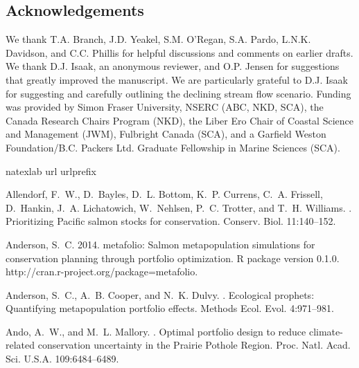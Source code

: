 \documentclass[12pt,english]{article}
\begin{document}
\begin{spacing}{1.9}
\section{Acknowledgements}\label{acknowledgements}

We thank T.A. Branch, J.D. Yeakel, S.M. O'Regan, S.A. Pardo, L.N.K. Davidson, and C.C. Phillis for helpful discussions and comments on earlier drafts. We thank D.J. Isaak, an anonymous reviewer, and O.P. Jensen for suggestions that greatly improved the manuscript. We are particularly grateful to D.J. Isaak for suggesting and carefully outlining the declining stream flow scenario. Funding was provided by Simon Fraser University, NSERC (ABC, NKD, SCA), the Canada Research Chairs Program (NKD), the Liber Ero Chair of Coastal Science and Management (JWM), Fulbright Canada (SCA), and a Garfield Weston Foundation/B.C. Packers Ltd. Graduate Fellowship in Marine Sciences (SCA).

%
%
%
\begin{thebibliography}{64}
\expandafter\ifx\csname natexlab\endcsname\relax\def\natexlab#1{#1}\fi
\expandafter\ifx\csname url\endcsname\relax
  \def\url#1{{\tt #1}}\fi
\expandafter\ifx\csname urlprefix\endcsname\relax\def\urlprefix{URL }\fi

Allendorf, F.~W., D.~Bayles, D.~L. Bottom, K.~P. Currens, C.~A. Frissell,
  D.~Hankin, J.~A. Lichatowich, W.~Nehlsen, P.~C. Trotter, and T.~H. Williams.
.
\newblock Prioritizing {Pacific} salmon stocks for conservation.
\newblock Conserv. Biol. 11:140--152.

Anderson, S.~C. 2014.
\newblock metafolio: Salmon metapopulation simulations for conservation
  planning through portfolio optimization. R package version 0.1.0.
  http://cran.r-project.org/package=metafolio.

Anderson, S.~C., A.~B. Cooper, and N.~K. Dulvy.
.
\newblock Ecological prophets: Quantifying metapopulation portfolio effects.
\newblock Methods Ecol. Evol. 4:971--981.

Ando, A.~W., and M.~L. Mallory.
.
\newblock Optimal portfolio design to reduce climate-related conservation
  uncertainty in the {Prairie Pothole Region}.
\newblock Proc. Natl. Acad. Sci. U.S.A. 109:6484--6489.


\end{thebibliography}
\end{spacing}
\end{document}
